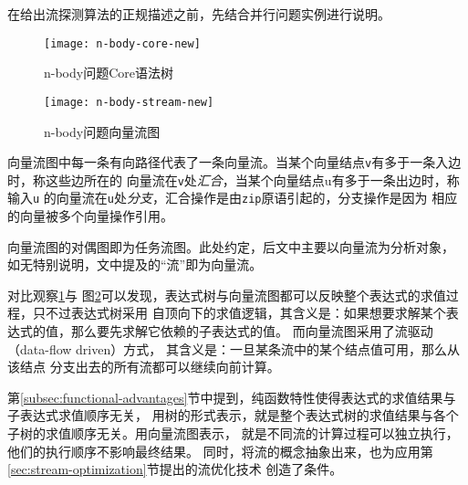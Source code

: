 在给出流探测算法的正规描述之前，先结合并行问题实例进行说明。
\begin{quotation}
\end{quotation}
\begin{figure}
  \centering
  \texttt{[image: n-body-core-new]}
  \caption{n-body问题Core语法树}
  \label{fig:n-body-core}
\end{figure}
\begin{figure}
  \centering
  \texttt{[image: n-body-stream-new]}
  \caption{n-body问题向量流图}
  \label{fig:n-body-stream}
\end{figure}

向量流图中每一条有向路径代表了一条向量流。当某个向量结点\texttt{v}有多于一条入边时，称这些边所在的
向量流在\texttt{v}处\emph{汇合}，当某个向量结点u有多于一条出边时，称输入\texttt{u}
的向量流在\texttt{u}处\emph{分支}，汇合操作是由\texttt{zip}原语引起的，分支操作是因为
相应的向量被多个向量操作引用。

向量流图的对偶图即为任务流图。此处约定，后文中主要以向量流为分析对象，
如无特别说明，文中提及的“流”即为向量流。

对比观察\ref{fig:n-body-core}与
图\ref{fig:n-body-stream}可以发现，表达式树与向量流图都可以反映整个表达式的求值过程，只不过表达式树采用
自顶向下的求值逻辑，其含义是：如果想要求解某个表达式的值，那么要先求解它依赖的子表达式的值。
而向量流图采用了流驱动（data-flow driven）方式，
其含义是：一旦某条流中的某个结点值可用，那么从该结点
分支出去的所有流都可以继续向前计算。

第\ref{subsec:functional-advantages}节中提到，纯函数特性使得表达式的求值结果与子表达式求值顺序无关，
用树的形式表示，就是整个表达式树的求值结果与各个子树的求值顺序无关。用向量流图表示，
就是不同流的计算过程可以独立执行，他们的执行顺序不影响最终结果。
同时，将流的概念抽象出来，也为应用第\ref{sec:stream-optimization}节提出的流优化技术
创造了条件。


